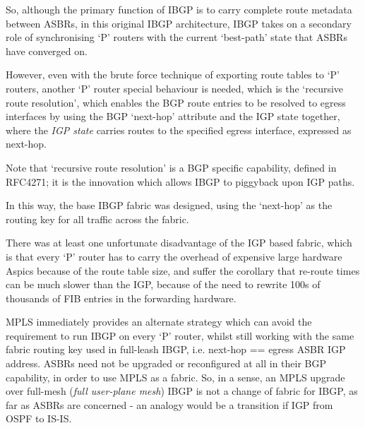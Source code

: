 So, although the primary function of IBGP is to carry complete route metadata between ASBRs, in this original IBGP architecture, IBGP takes on a secondary role of synchronising `P' routers with the current `best-path' state that ASBRs have converged on.

However, even with the brute force technique of exporting route tables to `P' routers, another `P' router special behaviour is needed, which is the `recursive route resolution', which enables the BGP route entries to be resolved to egress interfaces by using the BGP `next-hop' attribute and the IGP state together, where the \textit{IGP state} carries routes to the specified egress interface, expressed as next-hop.

Note that `recursive route resolution' is a BGP specific capability, defined in RFC4271; it is the innovation which allows IBGP to piggyback upon IGP paths.

\medskip

In this way, the base IBGP fabric was designed, using the `next-hop' as the routing key for all traffic across the fabric.

There was at least one unfortunate disadvantage of the IGP based fabric, which is that every `P' router has to carry the overhead of expensive large hardware Aspics because of the route table size, and suffer the corollary that re-route times can be much slower than the IGP, because of the need to rewrite 100s of thousands of FIB entries in the forwarding hardware.

\medskip

MPLS immediately provides an alternate strategy which can avoid the requirement to run IBGP on every `P' router, whilst still working with the same fabric routing key used in full-leash IBGP, i.e. next-hop == egress ASBR IGP address.  ASBRs need not be upgraded or reconfigured at all in their BGP capability, in order to use MPLS as a fabric.  So, in a sense, an MPLS upgrade over full-mesh (\textit{full user-plane mesh}) IBGP is not a change of fabric for IBGP, as far as ASBRs are concerned - an analogy would be a transition if IGP from OSPF to IS-IS.

\medskip

